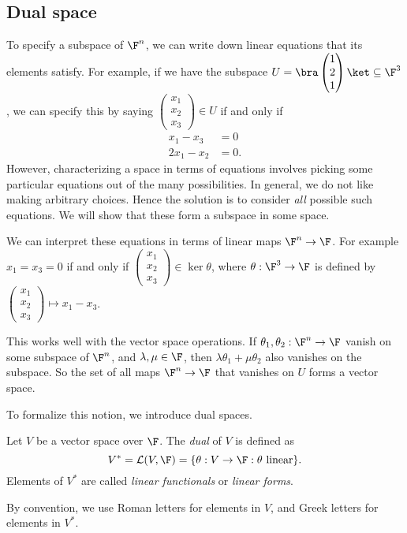 \documentclass[a4paper]{article}
\begin{document}
\subsection{Dual space}
To specify a subspace of $\F^n$, we can write down linear equations that its elements satisfy. For example, if we have the subspace $U = \bra \begin{pmatrix} 1\\2\\1 \end{pmatrix}\ket\subseteq \F^3$, we can specify this by saying $\begin{pmatrix}x_1\\ x_2\\ x_3\end{pmatrix} \in U$ if and only if
\begin{align*}
  x_1 - x_3 &= 0\\
  2x_1 - x_2 &= 0.
\end{align*}
However, characterizing a space in terms of equations involves picking some particular equations out of the many possibilities. In general, we do not like making arbitrary choices. Hence the solution is to consider \emph{all} possible such equations. We will show that these form a subspace in some space.

We can interpret these equations in terms of linear maps $\F^n \to \F$. For example $x_1 = x_3 = 0$ if and only if $\begin{pmatrix}x_1\\x_2\\x_3\end{pmatrix} \in \ker \theta$, where $\theta: \F^3 \to \F$ is defined by $\begin{pmatrix}x_1\\x_2\\x_3\end{pmatrix} \mapsto x_1 - x_3$.

This works well with the vector space operations. If $\theta_1, \theta_2: \F^n \to \F$ vanish on some subspace of $\F^n$, and $\lambda, \mu\in \F$, then $\lambda \theta_1 + \mu \theta_2$ also vanishes on the subspace. So the set of all maps $\F^n \to \F$ that vanishes on $U$ forms a vector space.

To formalize this notion, we introduce dual spaces.

\begin{defi}
  Let $V$ be a vector space over $\F$. The \emph{dual} of $V$ is defined as
  \[
    V^* = \mathcal{L}(V, \F) = \{\theta: V \to \F: \theta\text{ linear}\}.
  \]
  Elements of $V^*$ are called \emph{linear functionals} or \emph{linear forms}.
\end{defi}
By convention, we use Roman letters for elements in $V$, and Greek letters for elements in $V^*$.
\end{document}
